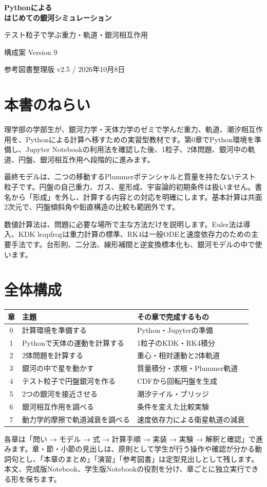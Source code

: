 \documentclass[10pt,openany]{book}
\begin{document}
\begin{center}
{\Large\sffamily\bfseries\color{navy} Pythonによる\\はじめての銀河シミュレーション}\par\medskip
{\large テスト粒子で学ぶ重力・軌道・銀河相互作用}\par\bigskip
{\Large\sffamily 構成案 Version 9}\par\medskip
参考図書整理版 v2.5 / 2026年10月8日
\end{center}
\section{本書のねらい}
理学部の学部生が、銀河力学・天体力学のゼミで学んだ重力、軌道、潮汐相互作用を、Pythonによる計算へ移すための実習型教材です。第0章でPython環境を準備し、Jupyter Notebookの利用法を確認した後、1粒子、2体問題、銀河中の軌道、円盤、銀河相互作用へ段階的に進みます。

最終モデルは、二つの移動するPlummerポテンシャルと質量を持たないテスト粒子です。円盤の自己重力、ガス、星形成、宇宙論的初期条件は扱いません。書名から「形成」を外し、計算する内容との対応を明確にします。基本計算は共面2次元で、円盤傾斜角や鉛直構造の比較も範囲外です。

数値計算法は、問題に必要な場所で主な方法だけを説明します。Euler法は導入、KDK leapfrogは重力計算の標準、RK4は一般ODEと速度依存力のための主要手法です。台形則、二分法、線形補間と逆変換標本化も、銀河モデルの中で使います。

\section{全体構成}
\begin{center}\small
\begin{tabularx}{\linewidth}{cXX}\toprule
章 & 主題 & その章で完成するもの\\\midrule
0 & 計算環境を準備する & Python・Jupyterの準備\\
1 & Pythonで天体の運動を計算する & 1粒子のKDK・RK4積分\\
2 & 2体問題を計算する & 重心・相対運動と2体軌道\\
3 & 銀河の中で星を動かす & 質量積分・求根・Plummer軌道\\
4 & テスト粒子で円盤銀河を作る & CDFから回転円盤を生成\\
5 & 2つの銀河を接近させる & 潮汐テイル・ブリッジ\\
6 & 銀河相互作用を調べる & 条件を変えた比較実験\\
7 & 動力学的摩擦で軌道減衰を調べる & 速度依存力による衛星軌道の減衰\\\bottomrule
\end{tabularx}\end{center}
各章は「問い → モデル → 式 → 計算手順 → 実装 → 実験 → 解釈と確認」で進みます。章・節・小節の見出しは、原則として学生が行う操作や確認が分かる動詞句とし、「本章のまとめ」「演習」「参考図書」は定型見出しとして残します。本文、完成版Notebook、学生版Notebookの役割を分け、章ごとに独立実行できる形を保ちます。
\end{document}

